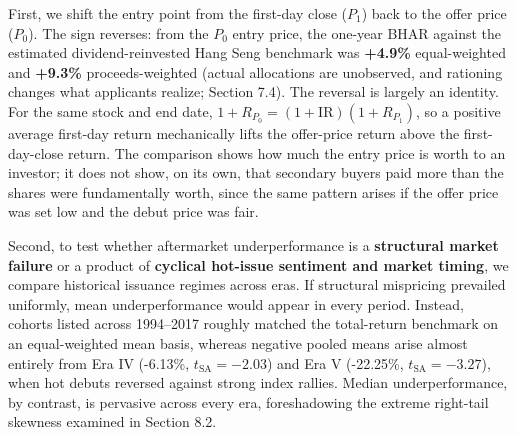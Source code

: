 \documentclass[11pt,letterpaper]{article}
\begin{document}
First, we shift the entry point from the first-day close ($P_1$) back to the offer price ($P_0$). The sign reverses: from the $P_0$ entry price, the one-year BHAR against the estimated dividend-reinvested Hang Seng benchmark was \textbf{+4.9\%} equal-weighted and \textbf{+9.3\%} proceeds-weighted (actual allocations are unobserved, and rationing changes what applicants realize; Section 7.4). The reversal is largely an identity. For the same stock and end date, $1 + R_{P_0} = (1 + \text{IR})(1 + R_{P_1})$, so a positive average first-day return mechanically lifts the offer-price return above the first-day-close return. The comparison shows how much the entry price is worth to an investor; it does not show, on its own, that secondary buyers paid more than the shares were fundamentally worth, since the same pattern arises if the offer price was set low and the debut price was fair.

Second, to test whether aftermarket underperformance is a \textbf{structural market failure} or a product of \textbf{cyclical hot-issue sentiment and market timing}, we compare historical issuance regimes across eras. If structural mispricing prevailed uniformly, mean underperformance would appear in every period. Instead, cohorts listed across 1994–2017 roughly matched the total-return benchmark on an equal-weighted mean basis, whereas negative pooled means arise almost entirely from Era IV (-6.13\%, $t_{\text{SA}} = -2.03$) and Era V (-22.25\%, $t_{\text{SA}} = -3.27$), when hot debuts reversed against strong index rallies. Median underperformance, by contrast, is pervasive across every era, foreshadowing the extreme right-tail skewness examined in Section 8.2.
\end{document}
